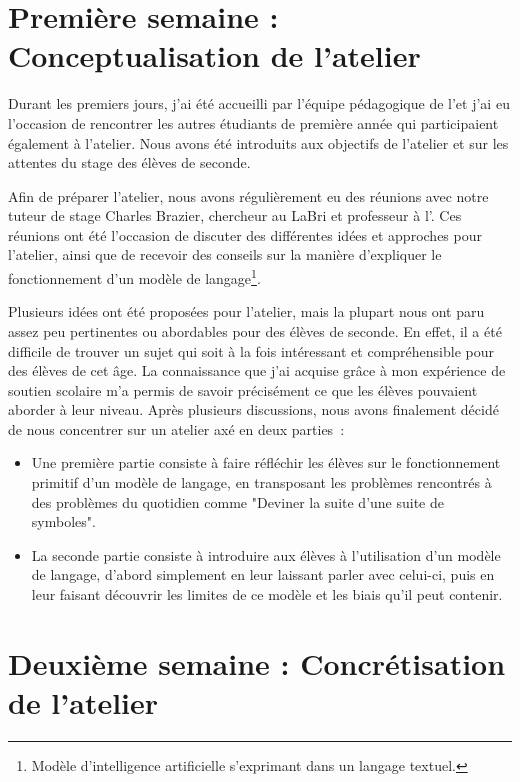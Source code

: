 \section{Première semaine : Conceptualisation de l'atelier}
  Durant les premiers jours, j'ai été accueilli par l'équipe pédagogique de l'\enseirb et j'ai eu l'occasion de rencontrer les autres étudiants de première année qui participaient également à l'atelier. Nous avons été introduits aux objectifs de l'atelier et sur les attentes du stage des élèves de seconde. \par
 Afin de préparer l'atelier, nous avons régulièrement eu des réunions avec notre tuteur de stage Charles Brazier, chercheur au LaBri et professeur à l'\enseirb. Ces réunions ont été l'occasion de discuter des différentes idées et approches pour l'atelier, ainsi que de recevoir des conseils sur la manière d'expliquer le fonctionnement d'un modèle de langage\footnote{Modèle d'intelligence artificielle s'exprimant dans un langage textuel.}. \par
 Plusieurs idées ont été proposées pour l'atelier, mais la plupart nous ont paru assez peu pertinentes ou abordables pour des élèves de seconde. En effet, il a été difficile de trouver un sujet qui soit à la fois intéressant et compréhensible pour des élèves de cet âge. La connaissance que j'ai acquise grâce à mon expérience de soutien scolaire m'a permis de savoir précisément ce que les élèves pouvaient aborder à leur niveau. Après plusieurs discussions, nous avons finalement décidé de nous concentrer sur un atelier axé en deux parties~:
\begin{itemize}
  \item Une première partie consiste à faire réfléchir les élèves sur le fonctionnement primitif d'un modèle de langage, en transposant les problèmes rencontrés à des problèmes du quotidien comme "Deviner la suite d'une suite de symboles".

  \item La seconde partie consiste à introduire aux élèves à l'utilisation d'un modèle de langage, d'abord simplement en leur laissant parler avec celui-ci, puis en leur faisant découvrir les limites de ce modèle et les biais qu'il peut contenir. 
\end{itemize}


\section{Deuxième semaine : Concrétisation de l'atelier}


